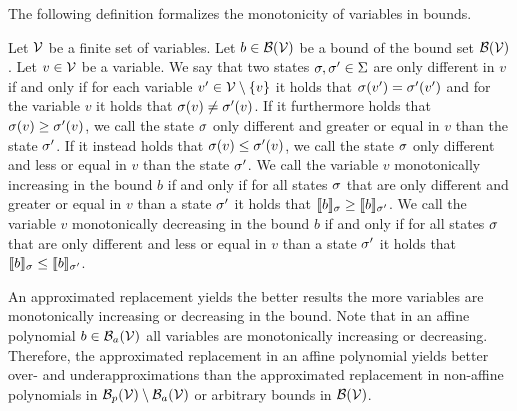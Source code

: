 The following definition formalizes the monotonicity of variables in bounds.

\begin{definition}
  Let $\mathcal{V}$ be a finite set of variables.
  Let $b \in \mathcal{B}(\mathcal{V})$ be a bound of the bound set $\mathcal{B}(\mathcal{V})$.
  Let $v \in \mathcal{V}$ be a variable.
  We say that two states $\sigma, \sigma' \in \Sigma$ are only different in $v$ if and only if for each variable $v' \in \mathcal{V} \setminus \lbrace v \rbrace$ it holds that $\sigma(v') = \sigma'(v')$ and for the variable $v$ it holds that $\sigma(v) \neq \sigma'(v)$.
  If it furthermore holds that $\sigma(v) \geq \sigma'(v)$, we call the state $\sigma$ only different and greater or equal in $v$ than the state $\sigma'$.
  If it instead holds that $\sigma(v) \leq \sigma'(v)$, we call the state $\sigma$ only different and less or equal in $v$ than the state $\sigma'$.
  We call the variable $v$ monotonically increasing in the bound $b$ if and only if for all states $\sigma$ that are only different and greater or equal in $v$ than a state $\sigma'$ it holds that $\llbracket b \rrbracket_{\sigma} \geq \llbracket b \rrbracket_{\sigma'}$.
  We call the variable $v$ monotonically decreasing in the bound $b$ if and only if for all states $\sigma$ that are only different and less or equal in $v$ than a state $\sigma'$ it holds that $\llbracket b \rrbracket_{\sigma} \leq \llbracket b \rrbracket_{\sigma'}$.
\end{definition}

An approximated replacement yields the better results the more variables are monotonically increasing or decreasing in the bound.
Note that in an affine polynomial $b \in \mathcal{B}_a(\mathcal{V})$ all variables are monotonically increasing or decreasing.
Therefore, the approximated replacement in an affine polynomial yields better over- and underapproximations than the approximated replacement in non-affine polynomials in $\mathcal{B}_p(\mathcal{V}) \setminus \mathcal{B}_a(\mathcal{V})$ or arbitrary bounds in $\mathcal{B}(\mathcal{V})$.
